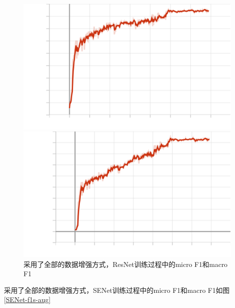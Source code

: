 \documentclass{article}
\begin{document}
\begin{figure}[H]
    \begin{minipage}[H]{0.5\linewidth}
        \centering
        \includegraphics[width=\textwidth]{figures/resnet_aug_microf1score_dev.png}
    \end{minipage}
    \begin{minipage}[H]{0.5\linewidth}
        \centering
        \includegraphics[width=\textwidth]{figures/resnet_aug_macrof1score_dev.png}
    \end{minipage}
    \caption{采用了全部的数据增强方式，ResNet训练过程中的micro F1和macro F1}
    \label{ResNet-f1s-aug}
\end{figure}

采用了全部的数据增强方式，SENet训练过程中的micro F1和macro F1如图\ref{SENet-f1s-aug}
\end{document}

